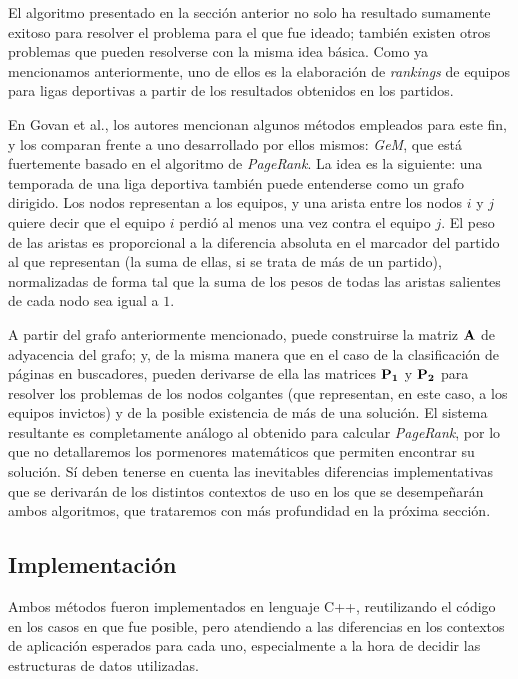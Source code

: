         El algoritmo presentado en la sección anterior no solo ha resultado sumamente exitoso para resolver el problema para el que fue ideado; también existen otros problemas que pueden resolverse con la misma idea básica. Como ya mencionamos anteriormente, uno de ellos es la elaboración de \emph{rankings} de equipos para ligas deportivas a partir de los resultados obtenidos en los partidos.

        En Govan et al.\cite{Govan2008}, los autores mencionan algunos métodos empleados para este fin, y los comparan frente a uno desarrollado por ellos mismos: \emph{GeM}, que está fuertemente basado en el algoritmo de \emph{PageRank}. La idea es la siguiente: una temporada de una liga deportiva también puede entenderse como un grafo dirigido. Los nodos representan a los equipos, y una arista entre los nodos $i$ y $j$ quiere decir que el equipo $i$ perdió al menos una vez contra el equipo $j$. El peso de las aristas es proporcional a la diferencia absoluta en el marcador del partido al que representan (la suma de ellas, si se trata de más de un partido), normalizadas de forma tal que la suma de los pesos de todas las aristas salientes de cada nodo sea igual a $1$.

        A partir del grafo anteriormente mencionado, puede construirse la matriz $\mathbf{A}$ de adyacencia del grafo; y, de la misma manera que en el caso de la clasificación de páginas en buscadores, pueden derivarse de ella las matrices $\mathbf{P_1}$ y $\mathbf{P_2}$ para resolver los problemas de los nodos colgantes (que representan, en este caso, a los equipos invictos) y de la posible existencia de más de una solución. El sistema resultante es completamente análogo al obtenido para calcular \emph{PageRank}, por lo que no detallaremos los pormenores matemáticos que permiten encontrar su solución. Sí deben tenerse en cuenta las inevitables diferencias implementativas que se derivarán de los distintos contextos de uso en los que se desempeñarán ambos algoritmos, que trataremos con más profundidad en la próxima sección.

    \subsection{Implementación}

    Ambos métodos fueron implementados en lenguaje C++, reutilizando el código en los casos en que fue posible, pero atendiendo a las diferencias en los contextos de aplicación esperados para cada uno, especialmente a la hora de decidir las estructuras de datos utilizadas.

